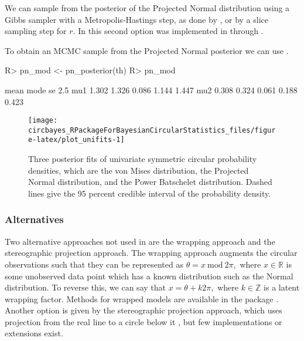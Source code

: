 We can sample from the posterior of the Projected Normal distribution
using a Gibbs sampler \citep{chib1995understanding} with a
Metropolis-Hastings \citep{metropolis1953equation, hastings1970monte}
step, as done by \citet{Nunez-Antonio2005}, or by a slice sampling
\citep{hernandez2017general} step for \(r\). In  this
second option was implemented in  through .

To obtain an MCMC sample from the Projected Normal posterior we can use
.

\begin{CodeChunk}

\begin{CodeInput}
R> pn_mod <- pn_posterior(th)
R> pn_mod 
\end{CodeInput}

\begin{CodeOutput}
     mean  mode    se  2.5%
mu1 1.302 1.326 0.086 1.144 1.447
mu2 0.308 0.324 0.061 0.188 0.423
\end{CodeOutput}
\end{CodeChunk}

\begin{CodeChunk}
\begin{figure}

{\centering \texttt{[image: circbayes\_RPackageForBayesianCircularStatistics\_files/figure-latex/plot\_unifits-1]} 

}

\caption[Three posterior fits of univariate symmetric circular probability densities, which are the von Mises distribution, the Projected Normal distribution, and the Power Batschelet distribution]{Three posterior fits of univariate symmetric circular probability densities, which are the von Mises distribution, the Projected Normal distribution, and the Power Batschelet distribution. Dashed lines give the 95 percent credible interval of the probability density.}\label{fig:plot_unifits}
\end{figure}
\end{CodeChunk}

\hypertarget{alternatives}{%
\subsubsection{Alternatives}\label{alternatives}}

Two alternative approaches not used in  are the wrapping
approach and the stereographic projection approach. The wrapping
approach augments the circular observations such that they can be
represented as \(\theta = x ~\text{mod} ~ 2\pi,\) where
\(x \in \mathbb{R}\) is some unobserved data point which has a known
distribution such as the Normal distribution. To reverse this, we can
say that \(x = \theta + k 2 \pi,\) where \(k \in \mathbb{Z}\) is a
latent wrapping factor. Methods for wrapped models are available in the
package  \citep{nadarajah2017wrapped}. Another option is
given by the stereographic projection approach, which uses projection
from the real line to a circle below it \citep{abe2010symmetric}, but
few implementations or extensions exist.

